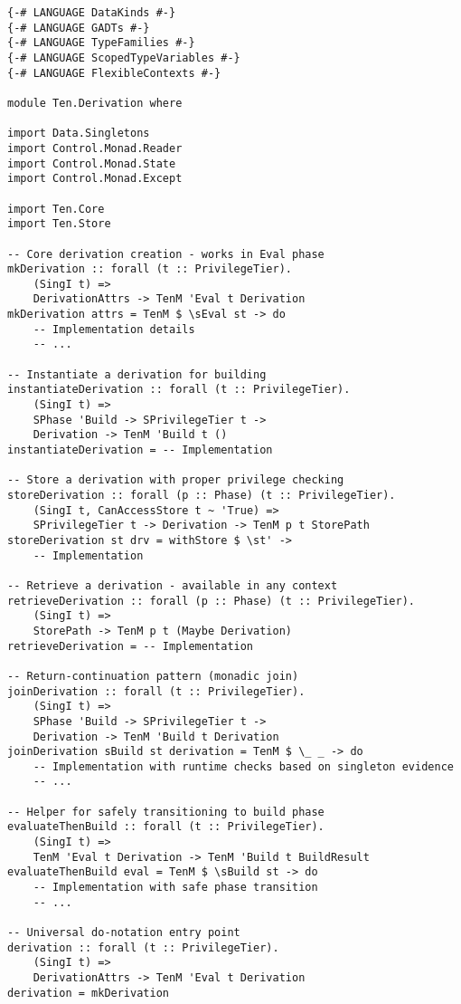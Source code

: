 \documentclass{article}
\begin{document}
\begin{tcolorbox}[title=Ten/Derivation.hs Changes]
\begin{verbatim}
{-# LANGUAGE DataKinds #-}
{-# LANGUAGE GADTs #-}
{-# LANGUAGE TypeFamilies #-}
{-# LANGUAGE ScopedTypeVariables #-}
{-# LANGUAGE FlexibleContexts #-}

module Ten.Derivation where

import Data.Singletons
import Control.Monad.Reader
import Control.Monad.State
import Control.Monad.Except

import Ten.Core
import Ten.Store

-- Core derivation creation - works in Eval phase
mkDerivation :: forall (t :: PrivilegeTier).
    (SingI t) =>
    DerivationAttrs -> TenM 'Eval t Derivation
mkDerivation attrs = TenM $ \sEval st -> do
    -- Implementation details
    -- ...

-- Instantiate a derivation for building
instantiateDerivation :: forall (t :: PrivilegeTier).
    (SingI t) =>
    SPhase 'Build -> SPrivilegeTier t ->
    Derivation -> TenM 'Build t ()
instantiateDerivation = -- Implementation

-- Store a derivation with proper privilege checking
storeDerivation :: forall (p :: Phase) (t :: PrivilegeTier).
    (SingI t, CanAccessStore t ~ 'True) =>
    SPrivilegeTier t -> Derivation -> TenM p t StorePath
storeDerivation st drv = withStore $ \st' ->
    -- Implementation

-- Retrieve a derivation - available in any context
retrieveDerivation :: forall (p :: Phase) (t :: PrivilegeTier).
    (SingI t) =>
    StorePath -> TenM p t (Maybe Derivation)
retrieveDerivation = -- Implementation

-- Return-continuation pattern (monadic join)
joinDerivation :: forall (t :: PrivilegeTier).
    (SingI t) =>
    SPhase 'Build -> SPrivilegeTier t ->
    Derivation -> TenM 'Build t Derivation
joinDerivation sBuild st derivation = TenM $ \_ _ -> do
    -- Implementation with runtime checks based on singleton evidence
    -- ...

-- Helper for safely transitioning to build phase
evaluateThenBuild :: forall (t :: PrivilegeTier).
    (SingI t) =>
    TenM 'Eval t Derivation -> TenM 'Build t BuildResult
evaluateThenBuild eval = TenM $ \sBuild st -> do
    -- Implementation with safe phase transition
    -- ...

-- Universal do-notation entry point
derivation :: forall (t :: PrivilegeTier).
    (SingI t) =>
    DerivationAttrs -> TenM 'Eval t Derivation
derivation = mkDerivation
\end{verbatim}
\end{tcolorbox}
\end{document}

